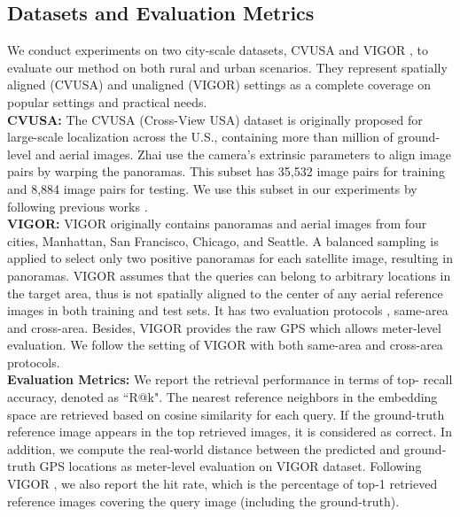 \documentclass[10pt,twocolumn,letterpaper]{article}
\begin{document}
\subsection{Datasets and Evaluation Metrics}
We conduct experiments on two city-scale datasets, \ie CVUSA \cite{Zhai} and VIGOR \cite{zhu2021vigor}, to evaluate our method on both rural and urban scenarios. They represent spatially aligned (CVUSA) and unaligned (VIGOR) settings as a complete coverage on popular settings and practical needs.\\\textbf{CVUSA:} The CVUSA (Cross-View USA) \cite{workman2015wide} dataset is originally proposed for large-scale localization across the U.S., containing more than  million of ground-level and aerial images. Zhai \etal \cite{Zhai} use the camera's extrinsic parameters to align image pairs by warping the panoramas. This subset has 35,532 image pairs for training and 8,884 image pairs for testing. We use this subset in our experiments by following previous works \cite{Zhai,CVM,SAFA}.\\
\textbf{VIGOR:} VIGOR \cite{zhu2021vigor} originally contains  panoramas and  aerial images from four cities, \ie Manhattan, San Francisco, Chicago, and Seattle. A balanced sampling is applied to select only two positive panoramas for each satellite image, resulting in  panoramas. VIGOR assumes that the queries can belong to  arbitrary locations in the target area, thus is not spatially aligned to the center of any aerial reference images in both training and test sets. It has two evaluation protocols \cite{zhu2021vigor}, \ie same-area and cross-area. Besides, VIGOR provides the raw GPS which allows meter-level evaluation. We follow the setting of VIGOR with both same-area and cross-area protocols. \\
\textbf{Evaluation Metrics:}
We report the retrieval performance in terms of top- recall accuracy, denoted as ``R@k". The  nearest reference neighbors in the embedding space are retrieved based on cosine similarity for each query. If the ground-truth reference image appears in the top  retrieved images, it is considered as correct. In addition, we compute the real-world distance between the predicted and ground-truth GPS locations as meter-level evaluation on VIGOR \cite{zhu2021vigor} dataset.  Following VIGOR \cite{zhu2021vigor}, we also report the hit rate, which is the percentage of top-1 retrieved reference images covering the query image  (including the ground-truth).
\end{document}
